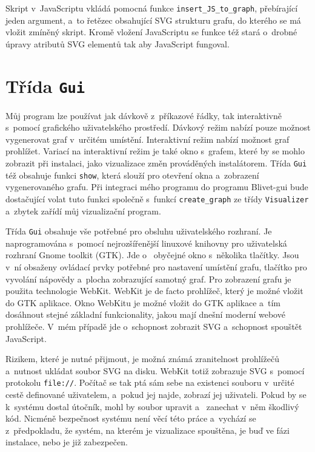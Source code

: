 \documentclass[printed,color,table,oneside,nolot,nolof]{fithesis}
\begin{document}
	Skript v~JavaScriptu vkládá pomocná funkce \texttt{insert\_JS\_to\_graph}, přebírající jeden argument, a~to řetězec obsahující SVG strukturu grafu, do kterého se má vložit zmíněný skript. 
	Kromě vložení JavaScriptu se funkce též stará o~drobné úpravy atributů SVG elementů tak aby JavaScript fungoval. 

\section{Třída \texttt{Gui}}
	Můj program lze používat jak dávkově z~příkazové řádky, tak interaktivně s~pomocí grafického uživatelského prostředí. Dávkový režim nabízí pouze možnost vygenerovat graf v~určitém 
	umístění. Interaktivní režim nabízí možnost graf prohlížet. Variací na interaktivní režim je také okno s~grafem, které by se mohlo zobrazit při instalaci, jako vizualizace změn prováděných
	instalátorem. Třída \texttt{Gui} též obsahuje funkci \texttt{show}, která slouží pro otevření okna a~zobrazení vygenerovaného grafu. 
	Při integraci mého programu do programu Blivet-gui bude dostačující volat tuto funkci společně s~funkcí \texttt{create\_graph} ze třídy \texttt{Visualizer} a~zbytek zařídí můj vizualizační program.

	Třída \texttt{Gui} obsahuje vše potřebné pro obsluhu uživatelského rozhraní. Je naprogramována s~pomocí nejrozšířenější linuxové knihovny pro uživatelská rozhraní Gnome toolkit (GTK). Jde o~
	obyčejné okno s~několika tlačítky. Jsou v~ní obsaženy ovládací prvky potřebné pro nastavení umístění grafu, tlačítko pro vyvolání 
	nápovědy a~plocha zobrazující samotný graf. Pro zobrazení grafu je použita technologie WebKit. WebKit je de facto prohlížeč, který je možné vložit do GTK aplikace.
	Okno WebKitu je možné vložit do GTK aplikace a~tím dosáhnout stejné základní funkcionality,
	jakou mají dnešní moderní webové prohlížeče. V~mém případě jde o~schopnost zobrazit SVG a~schopnost spouštět JavaScript.

	Rizikem, které je nutné přijmout, je možná známá zranitelnost prohlížečů a~nutnost ukládat soubor SVG na disku. WebKit totiž zobrazuje SVG s~pomocí protokolu \texttt{file://}. Počítač se
	tak ptá sám sebe na existenci souboru v~určité cestě definované uživatelem, a~pokud jej najde, zobrazí jej uživateli. Pokud by se k~systému dostal útočník, mohl by soubor upravit a~
	zanechat v~něm škodlivý kód. Nicméně bezpečnost systému není věcí této práce a~vychází se z~předpokladu, že systém, na kterém je vizualizace spouštěna, je buď ve fázi instalace, nebo
	je již zabezpečen. 
\end{document}
